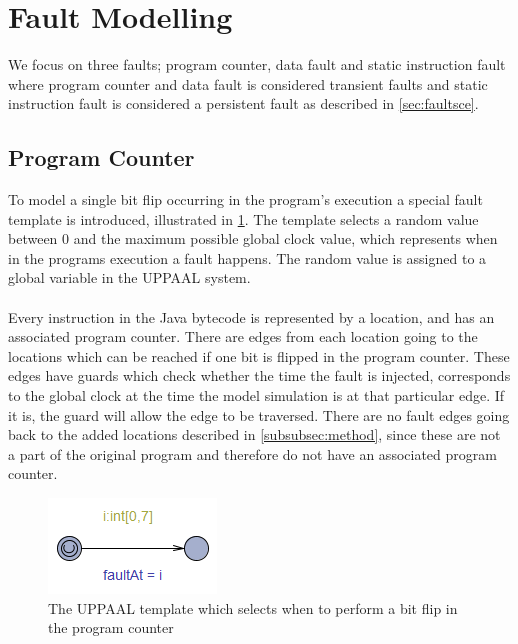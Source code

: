 \section{Fault Modelling}
We focus on three faults; program counter, data fault and static instruction fault where program counter and data fault is considered transient faults and static instruction fault is considered a persistent fault as described in \cref{sec:faultsce}.


\subsection{Program Counter}
To model a single bit flip occurring in the program's execution a special fault template is introduced, illustrated in \cref{fig:faultTime}. The template selects a random value between $0$ and the maximum possible global clock value, which represents when in the programs execution a fault happens. The random value is assigned to a global variable in the UPPAAL system.\\\\
Every instruction in the Java bytecode is represented by a location, and has an associated program counter. There are edges from each location going to the locations which can be reached if one bit is flipped in the program counter. These edges have guards which check whether the time the fault is injected, corresponds to the global clock at the time the model simulation is at that particular edge. If it is, the guard will allow the edge to be traversed. There are no fault edges going back to the added locations described in \cref{subsubsec:method}, since these are not a part of the original program and therefore do not have an associated program counter.
\begin{figure}[H]
\centering
\includegraphics{figures/fault.PNG}
\caption{The UPPAAL template which selects when to perform a bit flip in the program counter}
\label{fig:faultTime}
\end{figure}


